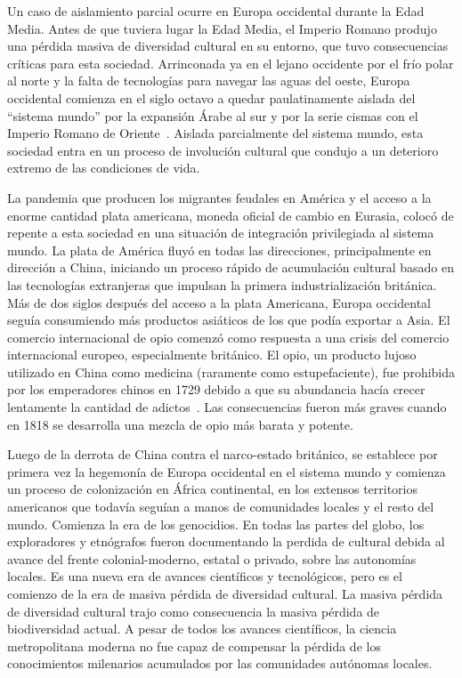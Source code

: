 \documentclass[a4paper,10pt]{book}
\theoremstyle{definition}
\begin{document}

Un caso de aislamiento parcial ocurre en Europa occidental durante la Edad Media.
%
Antes de que tuviera lugar la Edad Media, el Imperio Romano produjo una p\'erdida masiva de diversidad cultural en su entorno, que tuvo consecuencias cr\'iticas para esta sociedad.
%
Arrinconada ya en el lejano occidente por el fr\'io polar al norte y la falta de tecnolog\'ias para navegar las aguas del oeste, Europa occidental comienza en el siglo octavo a quedar paulatinamente aislada del ``sistema mundo'' por la expansi\'on Árabe al sur y por la serie cismas con el Imperio Romano de Oriente~\cite{Dussel}.
%
Aislada parcialmente del sistema mundo, esta sociedad entra en un proceso de involuci\'on cultural que condujo a un deterioro extremo de las condiciones de vida.


La pandemia que producen los migrantes feudales en América y el acceso a la enorme cantidad plata americana, moneda oficial de cambio en Eurasia, coloc\'o de repente a esta sociedad en una situaci\'on de integraci\'on privilegiada al sistema mundo. 
%
La plata de Am\'erica fluyó en todas las direcciones, principalmente en direcci\'on a China, iniciando un proceso r\'apido de acumulaci\'on cultural basado en las tecnolog\'ias extranjeras que impulsan la primera industrializaci\'on brit\'anica.
%
Más de dos siglos después del acceso a la plata Americana, Europa occidental seguía consumiendo más productos asi\'aticos de los que podía exportar a Asia.
%
El comercio internacional de opio comenz\'o como respuesta a una crisis del comercio internacional europeo, especialmente brit\'anico.
%
El opio, un producto lujoso utilizado en China como medicina (raramente como estupefaciente), fue prohibida por los emperadores chinos en 1729 debido a que su abundancia hac\'ia crecer lentamente la cantidad de adictos~\cite{Kennet}.
%
Las consecuencias fueron m\'as graves cuando en 1818 se desarrolla una mezcla de opio m\'as barata y potente.


Luego de la derrota de China contra el narco-estado brit\'anico, se establece por primera vez la hegemon\'ia de Europa occidental en el sistema mundo y comienza un proceso de colonizaci\'on en África continental, en los extensos territorios americanos que todav\'ia segu\'ian a manos de comunidades locales y el resto del mundo.
%
Comienza la era de los genocidios.
%
En todas las partes del globo, los exploradores y etn\'ografos fueron documentando la perdida de cultural debida al avance del frente colonial-moderno, estatal o privado, sobre las autonom\'ias locales.
%
Es una nueva era de avances cient\'ificos y tecnol\'ogicos, pero es el comienzo de la era de masiva p\'erdida de diversidad cultural.
%
La masiva p\'erdida de diversidad cultural trajo como consecuencia la masiva p\'erdida de biodiversidad actual.
%
A pesar de todos los avances cient\'ificos, la ciencia metropolitana moderna no fue capaz de compensar la p\'erdida de los conocimientos milenarios acumulados por las comunidades aut\'onomas locales.
\end{document}
